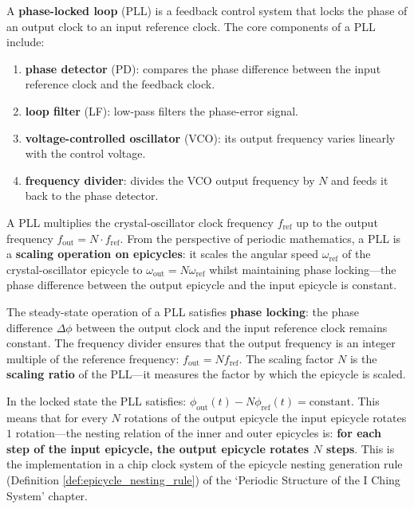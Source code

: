 \begin{definition}\label{def:pll_epicycle}
A \textbf{phase-locked loop} (PLL) is a feedback control system that locks the phase of an output clock to an input reference clock. The core components of a PLL include:
\begin{enumerate}[label=(\roman*)]
    \item \textbf{phase detector} (PD): compares the phase difference between the input reference clock and the feedback clock.
    \item \textbf{loop filter} (LF): low-pass filters the phase-error signal.
    \item \textbf{voltage-controlled oscillator} (VCO): its output frequency varies linearly with the control voltage.
    \item \textbf{frequency divider}: divides the VCO output frequency by $N$ and feeds it back to the phase detector.
\end{enumerate}
A PLL multiplies the crystal-oscillator clock frequency $f_{\text{ref}}$ up to the output frequency $f_{\text{out}} = N \cdot f_{\text{ref}}$. From the perspective of periodic mathematics, a PLL is a \textbf{scaling operation on epicycles}: it scales the angular speed $\omega_{\text{ref}}$ of the crystal-oscillator epicycle to $\omega_{\text{out}} = N\omega_{\text{ref}}$ whilst maintaining phase locking---the phase difference between the output epicycle and the input epicycle is constant.
\end{definition}

\begin{proposition}\label{prop:pll_phase_lock}
The steady-state operation of a PLL satisfies \textbf{phase locking}: the phase difference $\Delta\phi$ between the output clock and the input reference clock remains constant. The frequency divider ensures that the output frequency is an integer multiple of the reference frequency: $f_{\text{out}} = N f_{\text{ref}}$. The scaling factor $N$ is the \textbf{scaling ratio} of the PLL---it measures the factor by which the epicycle is scaled.

In the locked state the PLL satisfies: $\phi_{\text{out}}(t) - N\phi_{\text{ref}}(t) = \text{constant}$. This means that for every $N$ rotations of the output epicycle the input epicycle rotates $1$ rotation---the nesting relation of the inner and outer epicycles is: \textbf{for each step of the input epicycle, the output epicycle rotates $N$ steps}. This is the implementation in a chip clock system of the epicycle nesting generation rule (Definition \ref{def:epicycle_nesting_rule}) of the `Periodic Structure of the I Ching System' chapter.
\end{proposition}

